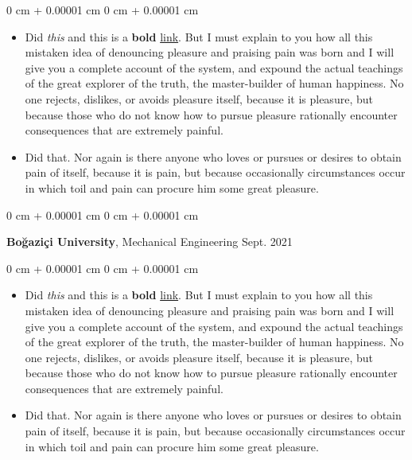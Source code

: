\documentclass[10pt, letterpaper]{article}
\newenvironment{highlights}{
    \begin{itemize}[
        topsep=0.10 cm,
        parsep=0.10 cm,
        partopsep=0pt,
        itemsep=0pt,
        leftmargin=0 cm + 10pt
    ]
}{
    \end{itemize}
} %
\newenvironment{onecolentry}{
    \begin{adjustwidth}{
        0 cm + 0.00001 cm
    }{
        0 cm + 0.00001 cm
    }
}{
    \end{adjustwidth}
} %
\newenvironment{twocolentry}[2][]{
    \onecolentry
    \def\secondColumn{#2}
    \setcolumnwidth{\fill, 4.5 cm}
    \begin{paracol}{2}
}{
    \switchcolumn \raggedleft \secondColumn
    \end{paracol}
    \endonecolentry
} %
\begin{document}
        \vspace{0.10 cm}
        \begin{onecolentry}
            \begin{highlights}
                \item Did \textit{this} and this is a \textbf{bold} \href{https://example.com}{link}. But I must explain to you how all this mistaken idea of denouncing pleasure and praising pain was born and I will give you a complete account of the system, and expound the actual teachings of the great explorer of the truth, the master-builder of human happiness. No one rejects, dislikes, or avoids pleasure itself, because it is pleasure, but because those who do not know how to pursue pleasure rationally encounter consequences that are extremely painful.
                \item Did that. Nor again is there anyone who loves or pursues or desires to obtain pain of itself, because it is pain, but because occasionally circumstances occur in which toil and pain can procure him some great pleasure.
            \end{highlights}
        \end{onecolentry}


        \vspace{0.2 cm}

        \begin{twocolentry}{
            Sept. 2021
        }
            \textbf{Boğaziçi University}, Mechanical Engineering\end{twocolentry}

        \vspace{0.10 cm}
        \begin{onecolentry}
            \begin{highlights}
                \item Did \textit{this} and this is a \textbf{bold} \href{https://example.com}{link}. But I must explain to you how all this mistaken idea of denouncing pleasure and praising pain was born and I will give you a complete account of the system, and expound the actual teachings of the great explorer of the truth, the master-builder of human happiness. No one rejects, dislikes, or avoids pleasure itself, because it is pleasure, but because those who do not know how to pursue pleasure rationally encounter consequences that are extremely painful.
                \item Did that. Nor again is there anyone who loves or pursues or desires to obtain pain of itself, because it is pain, but because occasionally circumstances occur in which toil and pain can procure him some great pleasure.
            \end{highlights}
        \end{onecolentry}
\end{document}
